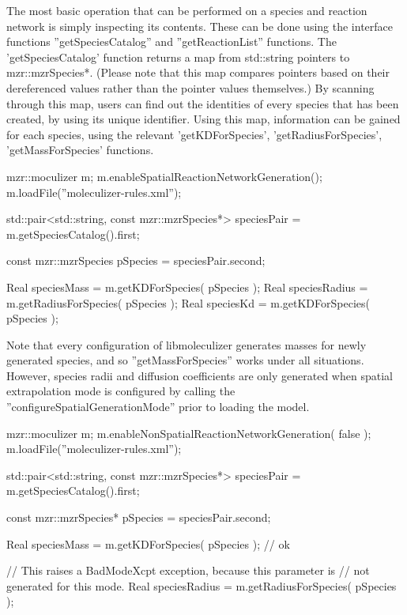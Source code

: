 The most basic operation that can be performed on a species and
reaction network is simply inspecting its contents.  These can be done
using the interface functions ''getSpeciesCatalog'' and
''getReactionList'' functions.  The 'getSpeciesCatalog' function
returns a map from std::string pointers to mzr::mzrSpecies*.  (Please
note that this map compares pointers based on their dereferenced
values rather than the pointer values themselves.)  By scanning
through this map, users can find out the identities of every species
that has been created, by using its unique identifier.  Using this
map, information can be gained for each species, using the relevant
'getKDForSpecies', 'getRadiusForSpecies', 'getMassForSpecies'
functions.  

\begin{LocalCPP}[caption=Finding spatial properties of a species
  using moleculizer]
mzr::moculizer m;
m.enableSpatialReactionNetworkGeneration();
m.loadFile(''moleculizer-rules.xml'');

std::pair<std::string, const mzr::mzrSpecies*> speciesPair =
m.getSpeciesCatalog().first;

const mzr::mzrSpecies pSpecies = speciesPair.second;

Real speciesMass = m.getKDForSpecies( pSpecies );
Real speciesRadius = m.getRadiusForSpecies( pSpecies );
Real speciesKd = m.getKDForSpecies( pSpecies );
\end{LocalCPP}

Note that every configuration of libmoleculizer generates masses for
newly generated species, and so ''getMassForSpecies'' works under all
situations.  However, species radii and diffusion coefficients are
only generated when spatial extrapolation mode is configured by
calling the ''configureSpatialGenerationMode'' prior to loading the
model.  

\begin{LocalCPP}[caption=Finding out information about species in
  non-spatial mode]
mzr::moculizer m;
m.enableNonSpatialReactionNetworkGeneration( false );
m.loadFile(''moleculizer-rules.xml'');

std::pair<std::string, const mzr::mzrSpecies*> speciesPair =
m.getSpeciesCatalog().first;

const mzr::mzrSpecies* pSpecies = speciesPair.second;

Real speciesMass = m.getKDForSpecies( pSpecies ); // ok

// This raises a BadModeXcpt exception, because this parameter is 
// not generated for this mode.
Real speciesRadius = m.getRadiusForSpecies( pSpecies ); 
\end{LocalCPP}

